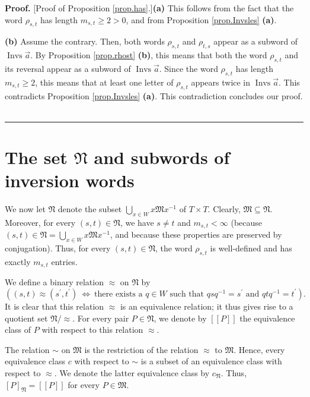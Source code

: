 \documentclass
[numbers=enddot,12pt,final,onecolumn,notitlepage,abstracton]{scrartcl}%
\theoremstyle{definition}
\newenvironment{proof}[1][Proof]{\noindent\textbf{#1.} }{\ \rule{0.5em}{0.5em}}
\begin{document}
\begin{proof}
[Proof of Proposition \ref{prop.has}.]\textbf{(a)} This follows from the fact
that the word $\rho_{s,t}$ has length $m_{s,t}\geq2>0$, and from Proposition
\ref{prop.Invsles} \textbf{(a)}. \medskip

\textbf{(b)} Assume the contrary. Then, both words $\rho_{s,t}$ and
$\rho_{t,s}$ appear as a subword of $\operatorname*{Invs}\overrightarrow{a}$.
By Proposition \ref{prop.rhost} \textbf{(b)}, this means that both the word
$\rho_{s,t}$ and its reversal appear as a subword of $\operatorname*{Invs}%
\overrightarrow{a}$. Since the word $\rho_{s,t}$ has length $m_{s,t}\geq2$,
this means that at least one letter of $\rho_{s,t}$ appears twice in
$\operatorname*{Invs}\overrightarrow{a}$. This contradicts Proposition
\ref{prop.Invsles} \textbf{(a)}. This contradiction concludes our proof.
\end{proof}

\section{The set $\mathfrak{N}$ and subwords of inversion words}

We now let $\mathfrak{N}$ denote the subset $\bigcup\limits_{x\in
W}x\mathfrak{M}x^{-1}$ of $T\times T$. Clearly, $\mathfrak{M}\subseteq
\mathfrak{N}$. Moreover, for every $\left(  s,t\right)  \in\mathfrak{N}$, we
have $s\neq t$ and $m_{s,t}<\infty$ (because $\left(  s,t\right)
\in\mathfrak{N}=\bigcup\limits_{x\in W}x\mathfrak{M}x^{-1}$, and because these
properties are preserved by conjugation). Thus, for every $\left(  s,t\right)
\in\mathfrak{N}$, the word $\rho_{s,t}$ is well-defined and has exactly
$m_{s,t}$ entries.

We define a binary relation $\approx$ on $\mathfrak{N}$ by%
\[
\left(  \left(  s,t\right)  \approx\left(  s^{\prime},t^{\prime}\right)
\ \Longleftrightarrow\ \text{there exists a }q\in W\text{ such that }%
qsq^{-1}=s^{\prime}\text{ and }qtq^{-1}=t^{\prime}\right)  .
\]
It is clear that this relation $\approx$ is an equivalence relation; it thus
gives rise to a quotient set $\mathfrak{N}/\approx$. For every pair
$P\in\mathfrak{N}$, we denote by $\left[  \left[  P\right]  \right]  $ the
equivalence class of $P$ with respect to this relation $\approx$.

The relation $\sim$ on $\mathfrak{M}$ is the restriction of the relation
$\approx$ to $\mathfrak{M}$. Hence, every equivalence class $c$ with respect
to $\sim$ is a subset of an equivalence class with respect to $\approx$. We
denote the latter equivalence class by $c_{\mathfrak{N}}$. Thus, $\left[
P\right]  _{\mathfrak{N}}=\left[  \left[  P\right]  \right]  $ for every
$P\in\mathfrak{M}$.
\end{document}
